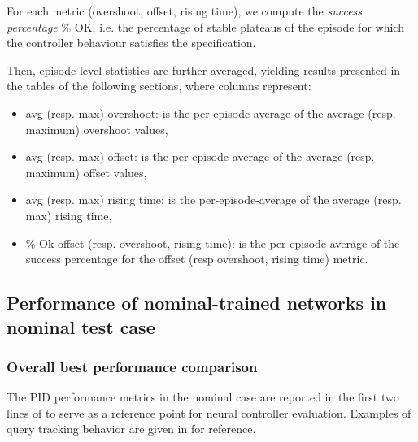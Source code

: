 \documentclass[anonymous=true,format=sigconf, screen=true, review=false]{acmart}
\begin{document}
For each metric (overshoot, offset, rising time), we compute the \emph{success percentage} {\% OK}, i.e. the percentage of stable plateaus of the episode for which the controller behaviour satisfies the specification.

Then, episode-level statistics are further averaged, yielding results presented in the tables of the following sections, where columns represent:
\begin{itemize}
    \item avg (resp. max) overshoot: is the per-episode-average of the average (resp. maximum) overshoot values,
    \item avg (resp. max) offset: is the per-episode-average of the average (resp. maximum) offset values,
    \item avg (resp. max) rising time: is the per-episode-average of the average (resp. max) rising time, 
    \item \% Ok offset (resp. overshoot, rising time): is the per-episode-average of the success percentage for the offset (resp overshoot, rising time) metric. 
\end{itemize}


\subsection{Performance of nominal-trained networks in nominal test case}
\label{sec:expnominal}




\subsubsection{Overall best performance comparison}
The PID performance metrics in the nominal case are reported in the first two lines of  to serve as a reference point for neural controller evaluation.
Examples of query tracking behavior are given in  for reference.
\end{document}
